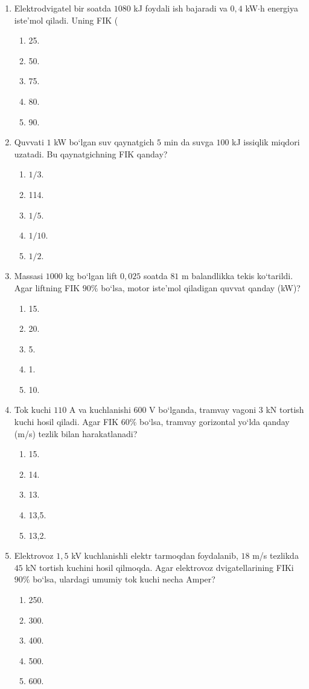 \begin{enumerate}
\item Elektrodvigatel bir soatda $1080$ kJ foydali ish bajaradi va $0,4$ kW$\cdot$h energiya iste’mol qiladi. Uning FIK (%
\begin{enumerate}[label=\Alph*)]
\item 25.
\item 50.
\item 75.
\item 80.
\item 90.
\end{enumerate}

\item Quvvati $1$ kW bo‘lgan suv qaynatgich $5$ min da suvga $100$ kJ issiqlik miqdori uzatadi. Bu qaynatgichning FIK qanday?
\begin{enumerate}[label=\Alph*)]
\item $1/3$.
\item 114.
\item $1/5$.
\item $1/10$.
\item $1/2$.
\end{enumerate}

\item Massasi $1000$ kg bo‘lgan lift $0,025$ soatda $81$ m balandlikka tekis ko‘tarildi. Agar liftning FIK $90\%$ bo‘lsa, motor iste’mol qiladigan quvvat qanday (kW)?
\begin{enumerate}[label=\Alph*)]
\item 15.
\item 20.
\item 5.
\item 1.
\item 10.
\end{enumerate}

\item Tok kuchi $110$ A va kuchlanishi $600$ V bo‘lganda, tramvay vagoni $3$ kN tortish kuchi hosil qiladi. Agar FIK $60\%$ bo‘lsa, tramvay gorizontal yo‘lda qanday (m/s) tezlik bilan harakatlanadi?
\begin{enumerate}[label=\Alph*)]
\item 15.
\item 14.
\item 13.
\item 13,5.
\item 13,2.
\end{enumerate}

\item Elektrovoz $1,5$ kV kuchlanishli elektr tarmoqdan foydalanib, $18$ m/s tezlikda $45$ kN tortish kuchini hosil qilmoqda. Agar elektrovoz dvigatellarining FIKi $90\%$ bo‘lsa, ulardagi umumiy tok kuchi necha Amper?
\begin{enumerate}[label=\Alph*)]
\item 250.
\item 300.
\item 400.
\item 500.
\item 600.
\end{enumerate}


\end{enumerate}
